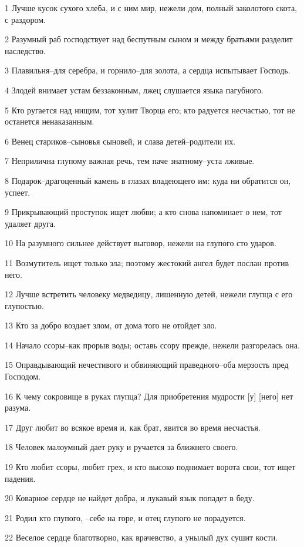 \par 1 Лучше кусок сухого хлеба, и с ним мир, нежели дом, полный заколотого скота, с раздором.
\par 2 Разумный раб господствует над беспутным сыном и между братьями разделит наследство.
\par 3 Плавильня--для серебра, и горнило--для золота, а сердца испытывает Господь.
\par 4 Злодей внимает устам беззаконным, лжец слушается языка пагубного.
\par 5 Кто ругается над нищим, тот хулит Творца его; кто радуется несчастью, тот не останется ненаказанным.
\par 6 Венец стариков--сыновья сыновей, и слава детей--родители их.
\par 7 Неприлична глупому важная речь, тем паче знатному--уста лживые.
\par 8 Подарок--драгоценный камень в глазах владеющего им: куда ни обратится он, успеет.
\par 9 Прикрывающий проступок ищет любви; а кто снова напоминает о нем, тот удаляет друга.
\par 10 На разумного сильнее действует выговор, нежели на глупого сто ударов.
\par 11 Возмутитель ищет только зла; поэтому жестокий ангел будет послан против него.
\par 12 Лучше встретить человеку медведицу, лишенную детей, нежели глупца с его глупостью.
\par 13 Кто за добро воздает злом, от дома того не отойдет зло.
\par 14 Начало ссоры--как прорыв воды; оставь ссору прежде, нежели разгорелась она.
\par 15 Оправдывающий нечестивого и обвиняющий праведного--оба мерзость пред Господом.
\par 16 К чему сокровище в руках глупца? Для приобретения мудрости [у] [него] нет разума.
\par 17 Друг любит во всякое время и, как брат, явится во время несчастья.
\par 18 Человек малоумный дает руку и ручается за ближнего своего.
\par 19 Кто любит ссоры, любит грех, и кто высоко поднимает ворота свои, тот ищет падения.
\par 20 Коварное сердце не найдет добра, и лукавый язык попадет в беду.
\par 21 Родил кто глупого, --себе на горе, и отец глупого не порадуется.
\par 22 Веселое сердце благотворно, как врачевство, а унылый дух сушит кости.
